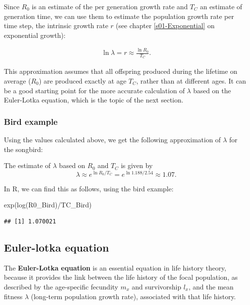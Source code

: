 \documentclass[
]{book}
\newenvironment{Shaded}{\begin{snugshade}}{\end{snugshade}}
\newcommand{\FunctionTok}[1]{\textcolor[rgb]{0.00,0.00,0.00}{#1}}
\newcommand{\NormalTok}[1]{#1}
\newcommand{\SpecialCharTok}[1]{\textcolor[rgb]{0.00,0.00,0.00}{#1}}
\begin{document}
Since \(R_0\) is an estimate of the per generation growth rate and \(T_C\) an estimate of generation time, we can use them to estimate the population growth rate per time step, the intrinsic growth rate \(r\) (see chapter \ref{s01-Exponential} on exponential growth):

\begin{align}
\ln\lambda = r \approx \frac{\ln R_0}{T_C}.
\label{eq:R0T}
\end{align}

This approximation assumes that all offspring produced during the lifetime on average (\(R_0\)) are produced exactly at age \(T_C\), rather than at different ages. It can be a good starting point for the more accurate calculation of \(\lambda\) based on the Euler-Lotka equation, which is the topic of the next section.

\hypertarget{bird-example-2}{%
\subsubsection*{Bird example}\label{bird-example-2}}

Using the values calculated above, we get the following approximation of \(\lambda\) for the songbird:

The estimate of \(\lambda\) based on \(R_0\) and \(T_C\) is given by
\[
\lambda\approx e^{\ln R_0/T_C}=e^{\ln 1.188/2.54}\approx 1.07.
\]

In R, we can find this as follows, using the bird example:

\begin{Shaded}
\begin{Highlighting}[]
\FunctionTok{exp}\NormalTok{(}\FunctionTok{log}\NormalTok{(R0\_Bird)}\SpecialCharTok{/}\NormalTok{TC\_Bird)}
\end{Highlighting}
\end{Shaded}

\begin{verbatim}
## [1] 1.070021
\end{verbatim}

\hypertarget{Euler}{%
\subsection{Euler-lotka equation}\label{Euler}}

The \textbf{Euler-Lotka equation} is an essential equation in life history theory, because it provides the link between the life history of the focal population, as described by the age-specific fecundity \(m_x\) and survivorship \(l_x\), and the mean fitness \(\lambda\) (long-term population growth rate), associated with that life history.
\end{document}
